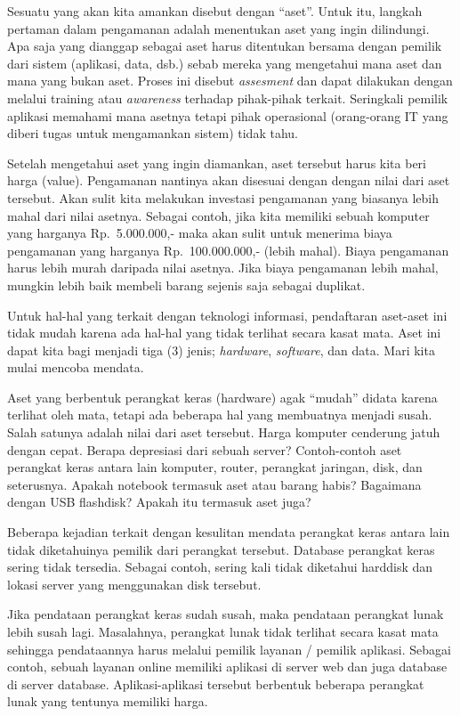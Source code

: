 Sesuatu yang akan kita amankan disebut dengan ``aset''. Untuk itu, langkah
pertaman dalam pengamanan adalah menentukan aset yang ingin dilindungi. Apa saja
yang dianggap sebagai aset harus ditentukan bersama dengan pemilik dari sistem
(aplikasi, data, dsb.) sebab mereka yang mengetahui mana aset dan mana yang
bukan aset.
Proses ini disebut {\em assesment} dan dapat dilakukan dengan melalui training
atau {\em awareness} terhadap pihak-pihak terkait. Seringkali pemilik aplikasi
memahami mana asetnya tetapi pihak operasional (orang-orang IT yang diberi
tugas untuk mengamankan sistem) tidak tahu.

Setelah mengetahui aset yang ingin diamankan, aset tersebut harus kita beri
harga (value). Pengamanan nantinya akan disesuai dengan dengan nilai dari aset
tersebut. Akan sulit kita melakukan investasi pengamanan yang biasanya lebih
mahal dari nilai asetnya. Sebagai contoh, jika kita memiliki sebuah komputer
yang harganya Rp.~5.000.000,- maka akan sulit untuk menerima biaya pengamanan
yang harganya Rp.~100.000.000,- (lebih mahal). Biaya pengamanan harus lebih
murah daripada nilai asetnya. Jika biaya pengamanan lebih mahal, mungkin lebih
baik membeli barang sejenis saja sebagai duplikat.

Untuk hal-hal yang terkait dengan teknologi informasi, pendaftaran aset-aset
ini tidak mudah karena ada hal-hal yang tidak terlihat secara kasat mata.  Aset
ini dapat kita bagi menjadi tiga (3) jenis; {\em hardware}, {\em software}, dan
data. Mari kita mulai mencoba mendata.

Aset yang berbentuk perangkat keras (hardware) agak ``mudah'' didata karena
terlihat oleh mata, tetapi ada beberapa hal yang membuatnya menjadi susah.
Salah satunya adalah nilai dari aset tersebut. Harga komputer cenderung jatuh
dengan cepat. Berapa depresiasi dari sebuah server?  Contoh-contoh aset
perangkat keras antara lain komputer, router, perangkat jaringan, disk, dan
seterusnya. Apakah notebook termasuk aset atau barang habis? Bagaimana dengan
USB flashdisk? Apakah itu termasuk aset juga?

Beberapa kejadian terkait dengan kesulitan mendata perangkat keras antara lain
tidak diketahuinya pemilik dari perangkat tersebut. Database perangkat keras
sering tidak tersedia. Sebagai contoh, sering kali tidak diketahui harddisk dan
lokasi server yang menggunakan disk tersebut.

Jika pendataan perangkat keras sudah susah, maka pendataan perangkat lunak
lebih susah lagi. Masalahnya, perangkat lunak tidak terlihat secara kasat mata
sehingga pendataannya harus melalui pemilik layanan / pemilik aplikasi. Sebagai
contoh, sebuah layanan online memiliki aplikasi di server web dan juga database
di server database. Aplikasi-aplikasi tersebut berbentuk beberapa perangkat
lunak yang tentunya memiliki harga.

